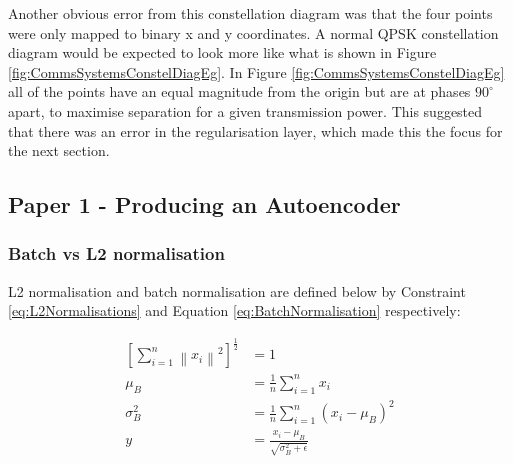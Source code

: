 \documentclass[12pt,onecolumn,letterpaper]{article}
\begin{document}
Another obvious error from this constellation diagram was that the four points were only mapped to binary x and y coordinates. A normal QPSK constellation diagram would be expected to look more like what is shown in Figure \ref{fig:CommsSystemsConstelDiagEg}. In Figure \ref{fig:CommsSystemsConstelDiagEg} all of the points have an equal magnitude from the origin but are at phases $90^{\circ}$ apart, to maximise separation for a given transmission power. This suggested that there was an error in the regularisation layer, which made this the focus for the next section. 

\subsection{Paper 1 - Producing an Autoencoder}

\subsubsection{Batch vs L2 normalisation}

L2 normalisation and batch normalisation are defined below by Constraint \ref{eq:L2Normalisations} and Equation \ref{eq:BatchNormalisation} respectively:

\begin{subequations}
\begin{align}
   \left[\sum_{i=1}^{n}\left \| x_i \right \|^2\right]^{\frac{1}{2}} &= 1 \label{eq:L2Normalisations}\\
   \mu_B &= \frac{1}{n} \sum_{i=1}^{n}x_i \\
   \sigma_B^2 &= \frac{1}{n} \sum_{i=1}^{n} \left(x_i - \mu_B \right)^2 \\
   y &= \frac{x_i - \mu_B}{\sqrt{\sigma_B^2 + \epsilon}}
   \label{eq:BatchNormalisation}
\end{align}
\end{subequations}
\end{document}
